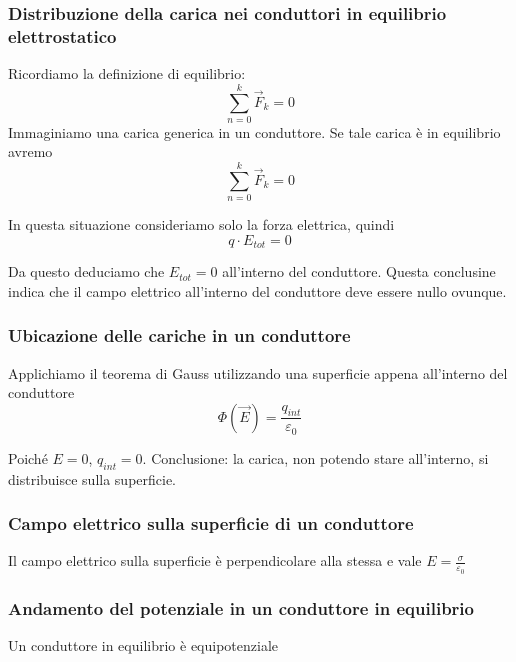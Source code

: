     \subsubsection{Distribuzione della carica nei conduttori in equilibrio elettrostatico}
        \par Ricordiamo la definizione di equilibrio:
        \begin{equation*}
            \sum_{n=0}^k \vec{F}_k=0
        \end{equation*}
        Immaginiamo una carica generica in un conduttore. Se tale carica è in equilibrio avremo
        \begin{equation*}
            \sum_{n=0}^k \vec{F}_k=0
        \end{equation*}
        \par In questa situazione consideriamo solo la forza elettrica, quindi
        \begin{equation*}
            q\cdot E_{tot}=0
        \end{equation*}
        \par Da questo deduciamo che $E_{tot}=0$ all'interno del conduttore. Questa conclusine indica che il campo elettrico all'interno del conduttore deve essere nullo ovunque.
    \subsubsection{Ubicazione delle cariche in un conduttore}
        \par Applichiamo il teorema di Gauss utilizzando una superficie appena all'interno del conduttore
        \begin{equation*}
            \Phi(\vec{E})=\frac{q_{int}}{\varepsilon_0}
        \end{equation*}
        \par Poiché $E=0$, $q_{int}=0$. Conclusione: la carica, non potendo stare all'interno, si distribuisce sulla superficie.
    \subsubsection{Campo elettrico sulla superficie di un conduttore}
        Il campo elettrico sulla superficie è perpendicolare alla stessa e vale $E=\frac{\sigma}{\varepsilon_0}$
    \subsubsection{Andamento del potenziale in un conduttore in equilibrio}
        \par Un conduttore in equilibrio è equipotenziale
